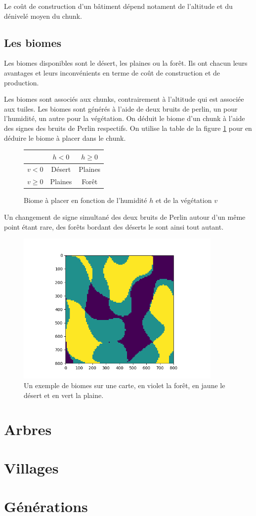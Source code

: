 \documentclass{article}
\begin{document}
Le coût de construction d'un bâtiment dépend notament de l'altitude et du dénivelé moyen du chunk. 

\subsection{Les biomes}

Les biomes disponibles sont le désert, les plaines ou la forêt. Ils ont chacun leurs avantages et leurs inconvénients en terme de coût de construction et de production.

Les biomes sont associés aux chunks, contrairement à l'altitude qui est associée aux tuiles. Les biomes sont générés à l'aide de deux bruits de perlin, un pour l'humidité, un autre pour la végétation. On déduit le biome d'un chunk à l'aide des signes des bruits de Perlin respectifs. On utilise la table de la figure \ref{fig:table_biome} pour en déduire le biome à placer dans le chunk.

\begin{figure}[h]
\begin{center}
\begin{tabular}{c | c  | c}
  & $h < 0$ & $h \ge 0$ \\ 
  \hline
 $v < 0$ & Désert & Plaines \\  
  \hline
 $v \ge 0$ & Plaines & Forêt    
\end{tabular}
\end{center}
\caption{Biome à placer en fonction de l'humidité $h$ et de la végétation $v$}
\label{fig:table_biome}
\end{figure}

Un changement de signe simultané des deux bruits de Perlin autour d'un même point étant rare, des forêts bordant des déserts le sont ainsi tout autant.

\begin{figure}[ht]
  \centering
  \includegraphics[width=10cm]{biome_map.png}
  \caption{Un exemple de biomes sur une carte, en violet la forêt, en jaune le désert et en vert la plaine.}
\end{figure}

\section{Arbres}

\section{Villages}

\section{Générations}
\end{document}
